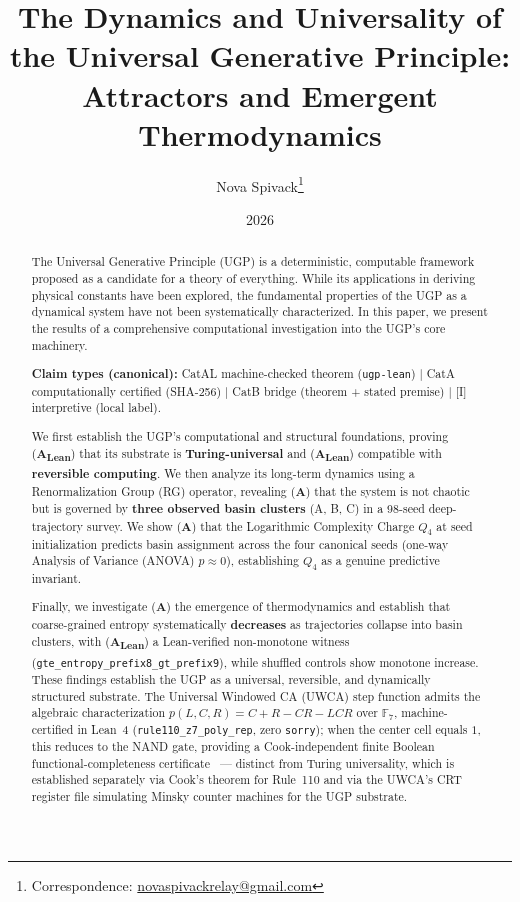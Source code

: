 \documentclass[11pt]{article}
\title{\vspace{-0.6em}\bf The Dynamics and Universality of the Universal Generative Principle: Attractors and Emergent Thermodynamics}
\author[1]{Nova Spivack\thanks{Correspondence:
  \href{mailto:novaspivackrelay@gmail.com}{novaspivackrelay@gmail.com}}}
\affil[1]{Independent Research}
\date{2026}
\newcommand{\CatAL}{\textbf{A\textsubscript{Lean}}}
\newcommand{\CatA}{\textbf{A}}
\begin{document}
\maketitle
\NovaZenodoAfterTitle

\begin{abstract}
The Universal Generative Principle (UGP) \cite{SpivackUGPFormalization,ugp-lean} is a deterministic, computable framework proposed as a candidate for a theory of everything. While its applications in deriving physical constants have been explored, the fundamental properties of the UGP as a dynamical system have not been systematically characterized. In this paper, we present the results of a comprehensive computational investigation into the UGP's core machinery.

\textbf{Claim types (canonical):} CatAL machine-checked theorem (\texttt{ugp-lean}) $|$ CatA computationally certified (SHA-256) $|$ CatB bridge (theorem + stated premise) $|$ [I] interpretive (local label).

We first establish the UGP's computational and structural foundations, proving (\CatAL) that its substrate is \textbf{Turing-universal} and (\CatAL) compatible with \textbf{reversible computing}. We then analyze its long-term dynamics using a Renormalization Group (RG) operator, revealing (\CatA) that the system is not chaotic but is governed by \textbf{three observed basin clusters} (A, B, C) in a 98-seed deep-trajectory survey. We show (\CatA) that the Logarithmic Complexity Charge $Q_4$ at seed initialization predicts basin assignment across the four canonical seeds (one-way Analysis of Variance (ANOVA) $p \approx 0$), establishing $Q_4$ as a genuine predictive invariant.

Finally, we investigate (\CatA) the emergence of thermodynamics and establish that coarse-grained entropy systematically \textbf{decreases} as trajectories collapse into basin clusters, with (\CatAL) a Lean-verified non-monotone witness (\texttt{gte\_entropy\_prefix8\_gt\_prefix9}), while shuffled controls show monotone increase. These findings establish the UGP as a universal, reversible, and dynamically structured substrate.
The Universal Windowed CA (UWCA) step function admits the algebraic characterization $p(L,C,R) = C+R-CR-LCR$ over $\mathbb{F}_7$, machine-certified in Lean~4 (\texttt{rule110\_z7\_poly\_rep}, zero \texttt{sorry}); when the center cell equals $1$, this reduces to the NAND gate, providing a Cook-independent finite Boolean functional-completeness certificate~\cite{rule110-lean} --- distinct from Turing universality, which is established separately via Cook's theorem for Rule~110 and via the UWCA's CRT register file simulating Minsky counter machines for the UGP substrate.
\end{abstract}
\end{document}
